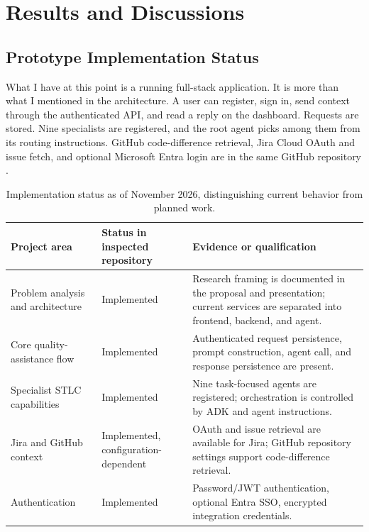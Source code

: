 \chapter{Results and Discussions}
\label{chap:experiments_and_results}

\section{Prototype Implementation Status}
What I have at this point is a running full-stack application. It is more than what I mentioned in the architecture. A user can register, sign in, send context through the authenticated API, and read a reply on the dashboard. Requests are stored. Nine specialists are registered, and the root agent picks among them from its routing instructions. GitHub code-difference retrieval, Jira Cloud OAuth and issue fetch, and optional Microsoft Entra login are in the same GitHub repository \cite{qaapprepo}.

\begin{table}[htbp]
\centering
\small
\begin{tabularx}{\textwidth}{p{}p{}X}
\toprule
\textbf{Project area} & \textbf{Status in inspected repository} & \textbf{Evidence or qualification} \\
\midrule
Problem analysis and architecture & Implemented & Research framing is documented in the proposal and presentation; current services are separated into frontend, backend, and agent. \\
Core quality-assistance flow & Implemented & Authenticated request persistence, prompt construction, agent call, and response persistence are present. \\
Specialist STLC capabilities & Implemented & Nine task-focused agents are registered; orchestration is controlled by ADK and agent instructions. \\
Jira and GitHub context & Implemented, configuration-dependent & OAuth and issue retrieval are available for Jira; GitHub repository settings support code-difference retrieval. \\
Authentication & Implemented & Password/JWT authentication, optional Entra SSO, encrypted integration credentials. \\
\bottomrule
\end{tabularx}
\caption{Implementation status as of November 2026, distinguishing current behavior from planned work.}
\label{tab:implementation-status}
\end{table}

